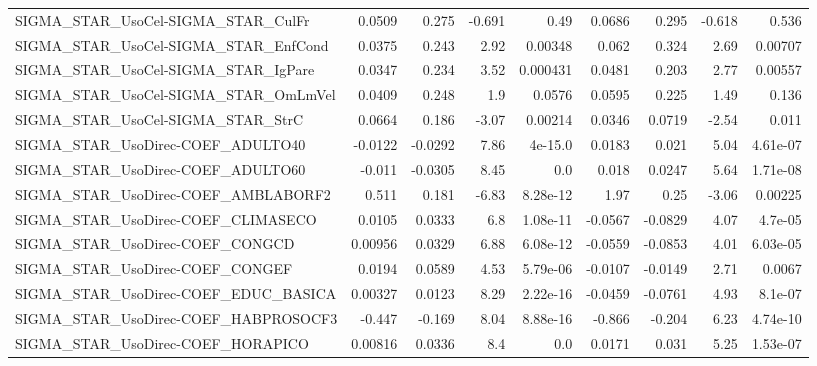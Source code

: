 \begin{tabular}{lrrrrrrrr}
SIGMA\_STAR\_UsoCel-SIGMA\_STAR\_CulFr     &      0.0509 &        0.275 &   -0.691 &     0.49 &     0.0686 &       0.295 &       -0.618 &         0.536 \\
SIGMA\_STAR\_UsoCel-SIGMA\_STAR\_EnfCond   &      0.0375 &        0.243 &     2.92 &  0.00348 &      0.062 &       0.324 &         2.69 &       0.00707 \\
SIGMA\_STAR\_UsoCel-SIGMA\_STAR\_IgPare    &      0.0347 &        0.234 &     3.52 & 0.000431 &     0.0481 &       0.203 &         2.77 &       0.00557 \\
SIGMA\_STAR\_UsoCel-SIGMA\_STAR\_OmLmVel   &      0.0409 &        0.248 &      1.9 &   0.0576 &     0.0595 &       0.225 &         1.49 &         0.136 \\
SIGMA\_STAR\_UsoCel-SIGMA\_STAR\_StrC      &      0.0664 &        0.186 &    -3.07 &  0.00214 &     0.0346 &      0.0719 &        -2.54 &         0.011 \\
SIGMA\_STAR\_UsoDirec-COEF\_ADULTO40      &     -0.0122 &      -0.0292 &     7.86 &  4e-15.0 &     0.0183 &       0.021 &         5.04 &      4.61e-07 \\
SIGMA\_STAR\_UsoDirec-COEF\_ADULTO60      &      -0.011 &      -0.0305 &     8.45 &      0.0 &      0.018 &      0.0247 &         5.64 &      1.71e-08 \\
SIGMA\_STAR\_UsoDirec-COEF\_AMBLABORF2    &       0.511 &        0.181 &    -6.83 & 8.28e-12 &       1.97 &        0.25 &        -3.06 &       0.00225 \\
SIGMA\_STAR\_UsoDirec-COEF\_CLIMASECO     &      0.0105 &       0.0333 &      6.8 & 1.08e-11 &    -0.0567 &     -0.0829 &         4.07 &       4.7e-05 \\
SIGMA\_STAR\_UsoDirec-COEF\_CONGCD        &     0.00956 &       0.0329 &     6.88 & 6.08e-12 &    -0.0559 &     -0.0853 &         4.01 &      6.03e-05 \\
SIGMA\_STAR\_UsoDirec-COEF\_CONGEF        &      0.0194 &       0.0589 &     4.53 & 5.79e-06 &    -0.0107 &     -0.0149 &         2.71 &        0.0067 \\
SIGMA\_STAR\_UsoDirec-COEF\_EDUC\_BASICA   &     0.00327 &       0.0123 &     8.29 & 2.22e-16 &    -0.0459 &     -0.0761 &         4.93 &       8.1e-07 \\
SIGMA\_STAR\_UsoDirec-COEF\_HABPROSOCF3   &      -0.447 &       -0.169 &     8.04 & 8.88e-16 &     -0.866 &      -0.204 &         6.23 &      4.74e-10 \\
SIGMA\_STAR\_UsoDirec-COEF\_HORAPICO      &     0.00816 &       0.0336 &      8.4 &      0.0 &     0.0171 &       0.031 &         5.25 &      1.53e-07 \\

\end{tabular}
